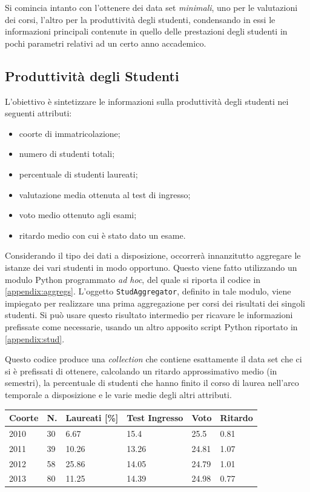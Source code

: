 	Si comincia intanto con l'ottenere dei data set \textit{minimali}, uno per le valutazioni dei corsi, l'altro per la produttività degli studenti, condensando in essi le informazioni principali contenute in quello delle prestazioni degli studenti in pochi parametri relativi ad un certo anno accademico. \\

	\subsection{Produttività degli Studenti}

		L'obiettivo è sintetizzare le informazioni sulla produttività degli studenti nei seguenti attributi:

		\begin{itemize}
			\item coorte di immatricolazione;
			\item numero di studenti totali;
			\item percentuale di studenti laureati;
			\item valutazione media ottenuta al test di ingresso;
			\item voto medio ottenuto agli esami;
			\item ritardo medio con cui è stato dato un esame.
		\end{itemize}


		Considerando il tipo dei dati a disposizione, occorrerà innanzitutto aggregare le istanze dei vari studenti in modo opportuno. Questo viene fatto utilizzando un modulo Python programmato \textit{ad hoc}, del quale si riporta il codice in \ref{appendix:aggregs}.	L'oggetto \texttt{StudAggregator}, definito in tale modulo, viene impiegato per realizzare una prima aggregazione per corsi dei risultati dei singoli studenti. Si può usare questo risultato intermedio per ricavare le informazioni prefissate come necessarie, usando un altro apposito script Python riportato in \ref{appendix:stud}.

		Questo codice produce una \textit{collection} che contiene esattamente il data set che ci si è prefissati di ottenere, calcolando un ritardo 	approssimativo medio (in semestri), la percentuale di studenti che hanno finito il corso di laurea nell'arco temporale a disposizione e le varie medie degli altri attributi.\\

		\begin{tabular}{llllll}
		\hline
		Coorte & N. & Laureati {[}\%{]} & Test Ingresso & Voto & Ritardo \\ \hline
		2010 & 30 & 6.67 & 15.4 & 25.5 & 0.81 \\
		2011 & 39 & 10.26 & 13.26 & 24.81 & 1.07 \\
		2012 & 58 & 25.86 & 14.05 & 24.79 & 1.01 \\
		2013 & 80 & 11.25 & 14.39 & 24.98 & 0.77 \\ \hline
		\end{tabular}

